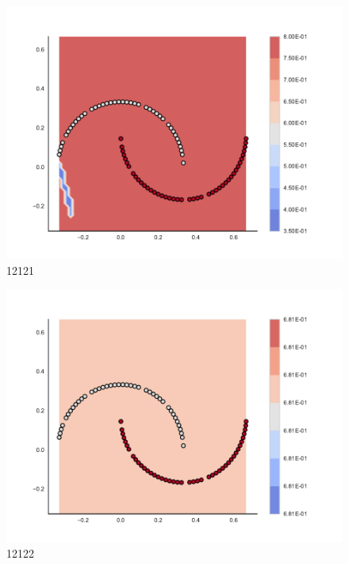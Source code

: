 \begin{subfigure}[b]{0.09\textwidth}
    \includegraphics[clip, trim=2.35cm 1.75cm 4.5cm 0cm,width=\textwidth]{img/convergence/12121.pdf}
    \caption{12121}
    \label{fig:convergence_12121}
\end{subfigure}
%
\begin{subfigure}[b]{0.09\textwidth}
    \includegraphics[clip, trim=2.35cm 1.75cm 4.5cm 0cm,width=\textwidth]{img/convergence/12122.pdf}
    \caption{12122}
    \label{fig:convergence_12122}
\end{subfigure}
%

